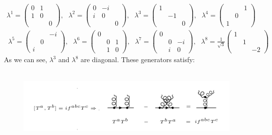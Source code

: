 \begin{equation}
\begin{split}
\lambda ^1 =\begin{pmatrix} 0& 1 &\\ 1& 0 &\\ & & 0 \end{pmatrix},\:\:\: \lambda ^2 =\begin{pmatrix} 0& -i &\\ i& 0 &\\ & & 0 \end{pmatrix}, 
\:\:\: \lambda ^3 =\begin{pmatrix} 1&  &\\ & -1 &\\ & & 0 \end{pmatrix}, \:\:\: \lambda ^4 =\begin{pmatrix} &  &1\\ & 0&\\1 & &  \end{pmatrix}\\\
\lambda ^5 =\begin{pmatrix} &  &-i\\ & 0 &\\ i& &  \end{pmatrix},\:\:\: \lambda ^6 =\begin{pmatrix} 0&  &\\ & 0 &1\\ & 1& 0 \end{pmatrix}, 
\:\:\: \lambda ^7 =\begin{pmatrix} 0&  &\\ & 0 &-i\\ & i& 0 \end{pmatrix}, \:\:\: \lambda ^8 =\frac{1}{\sqrt3}\begin{pmatrix} 1&  &\\ & 1&\\ & &-2  \end{pmatrix}
\end{split}
\end{equation}
As we can see, $ {\lambda}^3 $ and $  {\lambda}^8 $ are diagonal.
These generators satisfy:\\ 
\\
\begin{figure}[h!]
\centering
\includegraphics[scale=0.6]{images/Intro/Casimir.png}
\end{figure}
